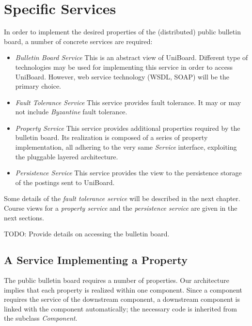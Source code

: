 \documentclass[oneside]{scrreprt}
\newcommand{\uniboard}{\mbox{UniBoard}}
\begin{document}
\chapter{Specific Services}

In order to implement the desired properties of the (distributed)
public bulletin board, a number of concrete services are required:

\begin{itemize}
	\item \emph{Bulletin Board Service} This is an abstract view
		of \uniboard. Different type of technologies may be used
		for implementing this service in order to access
		\uniboard. However, web service
		technology (WSDL, SOAP) will be the primary choice.
	\item \emph{Fault Tolerance Service} This service provides
		fault tolerance. It may or
		may not include \emph{Byzantine} fault tolerance.
	\item \emph{Property Service} This service provides additional
		properties required by the bulletin board. Its
		realization is composed of a series of property
		implementation, all adhering to the very same
		\emph{Service} interface, exploiting the pluggable
		layered architecture.
	\item \emph{Persistence Service} This service provides
		the view to the persistence storage of the postings
		sent to \uniboard.
\end{itemize}

Some details of the \emph{fault tolerance service} will be described
in the next chapter. Course views for a \emph{property service}
and the \emph{persistence service} are given in the next sections.

TODO: Provide details on accessing the bulletin board.


\section{A Service Implementing a Property}

The public bulletin board requires a number of properties. Our
architecture implies that each property is realized within
one component. Since a component requires the service of
the downstream component, a downstream component is
linked with the component automatically; the necessary
code is inherited from the subclass \emph{Component}.
\end{document}
